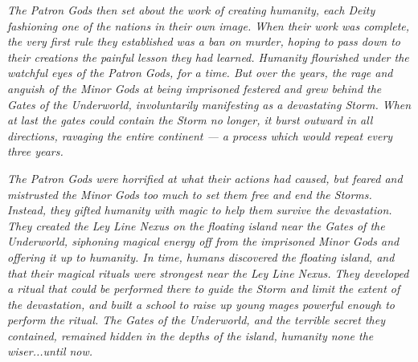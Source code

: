 {{\emph{The Patron Gods then set about the work of creating humanity, each Deity fashioning one of the nations in their own image. When their work was complete, the very first rule they established was a ban on murder, hoping to pass down to their creations the painful lesson they had learned. Humanity flourished under the watchful eyes of the Patron Gods, for a time. But over the years, the rage and anguish of the Minor Gods at being imprisoned festered and grew behind the Gates of the Underworld, involuntarily manifesting as a devastating Storm. When at last the gates could contain the Storm no longer, it burst outward in all directions, ravaging the entire continent — a process which would repeat every three years.} 

\emph{The Patron Gods were horrified at what their actions had caused, but feared and mistrusted the Minor Gods too much to set them free and end the Storms. Instead, they gifted humanity with magic to help them survive the devastation. They created the Ley Line Nexus on the floating island near the Gates of the Underworld, siphoning magical energy off from the imprisoned Minor Gods and offering it up to humanity. In time, humans discovered the floating island, and that their magical rituals were strongest near the Ley Line Nexus. They developed a ritual that could be performed there to guide the Storm and limit the extent of the devastation, and built a school to raise up young mages powerful enough to perform the ritual. The Gates of the Underworld, and the terrible secret they contained, remained hidden in the depths of the island, humanity none the wiser...until now.}


	}	
}


